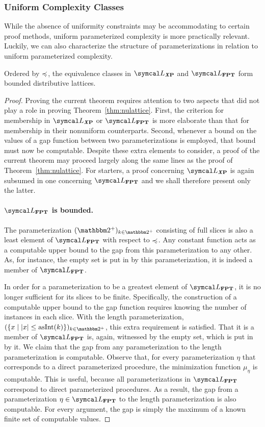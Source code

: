 \subsubsection{Uniform Complexity Classes}
While the absence of uniformity constraints may be accommodating to certain proof methods, uniform parameterized complexity is more practically relevant.
Luckily, we can also characterize the structure of parameterizations in relation to uniform parameterized complexity.
\begin{theorem}
\label{thm:lattice}%
  Ordered by $\preccurlyeq$, the equivalence classes in $\calL_\clX{P}$ and $\calL_\cl{FPT}$ form bounded distributive lattices.
\end{theorem}
\begin{proof}
  Proving the current theorem requires attention to two aspects that did not play a role in proving  Theorem~\ref{thm:nulattice}.
  First, the criterion for membership in $\calL_\clX{P}$ or $\calL_\cl{FPT}$ is more elaborate than that for membership in their nonuniform counterparts.
  Second, whenever a bound on the values of a gap function between two parameterizations is employed, that bound must now be computable.
  Despite these extra elements to consider, a proof of the current theorem may proceed largely along the same lines as the proof of Theorem~\ref{thm:nulattice}.
  For starters, a proof concerning $\calL_\clX{P}$ is again subsumed in one concerning $\calL_\cl{FPT}$ and we shall therefore present only the latter.

  \paragraph{$\calL_\cl{FPT}$ is bounded.}
  The parameterization $(\binary^+)_{k \in \binary^+}$ consisting of full slices is also a least element of $\calL_\cl{FPT}$ with respect to $\preccurlyeq$.
  Any constant function acts as a computable upper bound to the gap from this parameterization to any other.
  As, for instance, the empty set is put in  by this parameterization, it is indeed a member of $\calL_\cl{FPT}$.

  In order for a parameterization to be a greatest element of $\calL_\cl{FPT}$, it is no longer sufficient for its slices to be finite.
  Specifically, the construction of a computable upper bound to the gap function requires knowing the number of instances in each slice.
  With the length parameterization, $(\{x \st \length{x} \le \asNat(k)\})_{k \in \binary^+}$, this extra requirement is satisfied.
  That it is a member of $\calL_\cl{FPT}$ is, again, witnessed by the empty set, which is put in  by it.
  We claim that the gap from any parameterization to the length parameterization is computable.
  Observe that, for every parameterization $\eta$ that corresponds to a direct parameterized procedure, the minimization function $\mu_\eta$ is computable.
  This is useful, because all parameterizations in $\calL_\cl{FPT}$ correspond to direct parameterized procedures.
  As a result, the gap from a parameterization $\eta \in \calL_\cl{FPT}$ to the length parameterization is also computable.
  For every argument, the gap is simply the maximum of a known finite set of computable values.


\end{proof}
